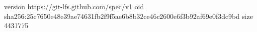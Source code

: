 version https://git-lfs.github.com/spec/v1
oid sha256:25c7650e48e39ae74631fb2f9f5ae6b8b32ce46c2600e6f3b92af69e0f3dc9bd
size 4431775
